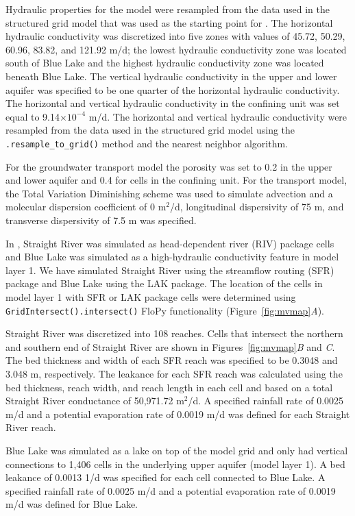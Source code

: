 \documentclass[11pt, oneside]{article}  	%
\begin{document}
Hydraulic properties for the model were resampled from the data used in the structured grid model that was used as the starting point for \cite{hill1998} \citep{pollock2014percomm}. The horizontal hydraulic conductivity was discretized into five zones with values of 45.72, 50.29, 60.96, 83.82, and 121.92 m/d; the lowest hydraulic conductivity zone was located south of Blue Lake and the highest hydraulic conductivity zone was located beneath Blue Lake. The vertical hydraulic conductivity in the upper and lower aquifer was specified to be one quarter of the horizontal hydraulic conductivity. The horizontal and vertical hydraulic conductivity in the confining unit was set equal to 9.14$\times10^{-4}$ m/d. The horizontal and vertical hydraulic conductivity  were resampled from the data used in the structured grid model using the \texttt{.resample\_to\_grid()} method and the nearest neighbor algorithm.

For the groundwater transport model the porosity was set to 0.2 in the upper and lower aquifer and 0.4 for cells in the confining unit.  For the transport model, the Total Variation Diminishing scheme was used to simulate advection and a  molecular dispersion coefficient of 0 m$^2$/d, longitudinal dispersivity of 75 m, and transverse dispersivity of 7.5 m was specified.

In \cite{hill1998}, Straight River was simulated as head-dependent river (RIV) package cells and Blue Lake was simulated as a high-hydraulic conductivity feature in model layer 1. We have simulated Straight River using the streamflow routing (SFR) package and Blue Lake using the LAK package. The location of the cells in model layer 1 with SFR or LAK package cells were determined using \texttt{GridIntersect().intersect()} FloPy functionality (Figure~\ref{fig:mvmap}\textit{A}). 

Straight River was discretized into 108 reaches. Cells that intersect the northern and southern end of Straight River are shown in Figures~\ref{fig:mvmap}\textit{B} and \textit{C}. The bed thickness and  width of each SFR reach was specified to be 0.3048 and 3.048 m, respectively. The leakance for each SFR reach was calculated using the bed thickness, reach width, and reach length in each cell and based on a total Straight River conductance of 50,971.72 m$^2$/d. A specified rainfall rate of 0.0025 m/d and a potential evaporation rate of  0.0019 m/d was defined for each Straight River reach.

Blue Lake was simulated as a lake on top of the model grid and only had vertical connections to 1,406 cells in the underlying upper aquifer (model layer 1). A bed leakance of 0.0013 1/d was specified for each cell connected to Blue Lake. A specified rainfall rate of 0.0025 m/d and a potential evaporation rate of 0.0019 m/d was defined for Blue Lake.
\end{document}
